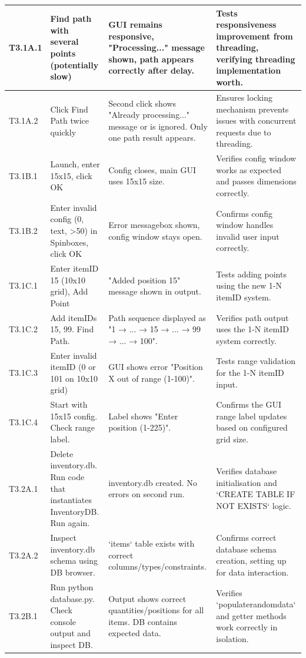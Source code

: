 \begin{longtable}{|p{}|p{}|p{}|p{}|}
	T3.1A.1 & Find path with several points (potentially slow) & GUI remains responsive, "Processing..." message shown, path appears correctly after delay. & Tests responsiveness improvement from threading, verifying threading implementation worth. \\
	\hline
	T3.1A.2 & Click Find Path twice quickly & Second click shows "Already processing..." message or is ignored. Only one path result appears. & Ensures locking mechanism prevents issues with concurrent requests due to threading. \\
	\hline
	T3.1B.1 & Launch, enter 15x15, click OK & Config closes, main GUI uses 15x15 size. & Verifies config window works as expected and passes dimensions correctly. \\
	\hline
	T3.1B.2 & Enter invalid config (0, text, >50) in Spinboxes, click OK & Error messagebox shown, config window stays open. & Confirms config window handles invalid user input correctly. \\
	\hline
	T3.1C.1 & Enter itemID 15 (10x10 grid), Add Point & "Added position 15" message shown in output. & Tests adding points using the new 1-N itemID system. \\
	\hline
	T3.1C.2 & Add itemIDs 15, 99. Find Path. & Path sequence displayed as "1 → ... → 15 → ... → 99 → ... → 100". & Verifies path output uses the 1-N itemID system correctly. \\
	\hline
	T3.1C.3 & Enter invalid itemID (0 or 101 on 10x10 grid) & GUI shows error "Position X out of range (1-100)". & Tests range validation for the 1-N itemID input. \\
	\hline
	T3.1C.4 & Start with 15x15 config. Check range label. & Label shows "Enter position (1-225)". & Confirms the GUI range label updates based on configured grid size. \\
	\hline
	T3.2A.1 & Delete inventory.db. Run code that instantiates InventoryDB. Run again. & inventory.db created. No errors on second run. & Verifies database initialisation and `CREATE TABLE IF NOT EXISTS` logic. \\
	\hline
	T3.2A.2 & Inspect inventory.db schema using DB browser. & `items` table exists with correct columns/types/constraints. & Confirms correct database schema creation, setting up for data interaction. \\
	\hline
	T3.2B.1 & Run python database.py. Check console output and inspect DB. & Output shows correct quantities/positions for all items. DB contains expected data. & Verifies `populaterandomdata` and getter methods work correctly in isolation. \\

\end{longtable}

